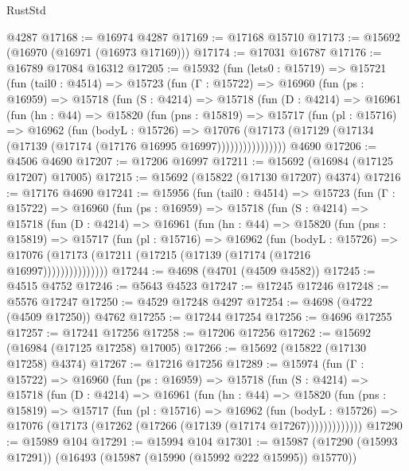 \begin{lexlean}{RustStd}
\begin{coremodule}
    @4287
@17168 := @16974 @4287
@17169 := @17168 @15710
@17173 := @15692 (@16970 (@16971 (@16973 @17169)))
@17174 := @17031 @16787
@17176 := @16789 @17084 @16312
@17205 := @15932
    (fun (lets0 : @15719) =>
    @15721
      (fun (tail0 : @4514) =>
      @15723
        (fun (Γ : @15722) =>
        @16960
          (fun (ps : @16959) =>
          @15718
            (fun (S : @4214) =>
            @15718
              (fun (D : @4214) =>
              @16961
                (fun (hn : @44) =>
                @15820
                  (fun (pns : @15819) =>
                  @15717
                    (fun (pl : @15716) =>
                    @16962
                      (fun (bodyL : @15726) =>
                      @17076
                        (@17173
                          (@17129 (@17134 (@17139 (@17174 (@17176 @16995 @16997))))))))))))))))
    @4690
@17206 := @4506 @4690
@17207 := @17206 @16997
@17211 := @15692 (@16984 (@17125 @17207) @17005)
@17215 := @15692 (@15822 (@17130 @17207) @4374)
@17216 := @17176 @4690
@17241 := @15956
    (fun (tail0 : @4514) =>
    @15723
      (fun (Γ : @15722) =>
      @16960
        (fun (ps : @16959) =>
        @15718
          (fun (S : @4214) =>
          @15718
            (fun (D : @4214) =>
            @16961
              (fun (hn : @44) =>
              @15820
                (fun (pns : @15819) =>
                @15717
                  (fun (pl : @15716) =>
                  @16962
                    (fun (bodyL : @15726) =>
                    @17076 (@17173 (@17211 (@17215 (@17139 (@17174 (@17216 @16997)))))))))))))))
@17244 := @4698 (@4701 (@4509 @4582))
@17245 := @4515 @4752
@17246 := @5643 @4523
@17247 := @17245 @17246
@17248 := @5576 @17247
@17250 := @4529 @17248 @4297
@17254 := @4698 (@4722 (@4509 @17250)) @4762
@17255 := @17244 @17254
@17256 := @4696 @17255
@17257 := @17241 @17256
@17258 := @17206 @17256
@17262 := @15692 (@16984 (@17125 @17258) @17005)
@17266 := @15692 (@15822 (@17130 @17258) @4374)
@17267 := @17216 @17256
@17289 := @15974
    (fun (Γ : @15722) =>
    @16960
      (fun (ps : @16959) =>
      @15718
        (fun (S : @4214) =>
        @15718
          (fun (D : @4214) =>
          @16961
            (fun (hn : @44) =>
            @15820
              (fun (pns : @15819) =>
              @15717
                (fun (pl : @15716) =>
                @16962
                  (fun (bodyL : @15726) =>
                  @17076 (@17173 (@17262 (@17266 (@17139 (@17174 @17267)))))))))))))
@17290 := @15989 @104
@17291 := @15994 @104
@17301 := @15987 (@17290 (@15993 @17291)) (@16493 (@15987 (@15990 (@15992 @222 @15995)) @15770))

\end{coremodule}
\end{lexlean}
